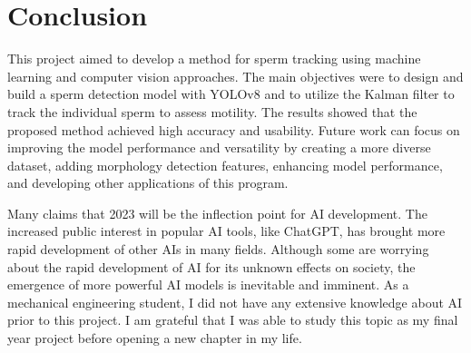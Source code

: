 \chapter{Conclusion}
This project aimed to develop a method for sperm tracking using machine learning and computer vision approaches. The main objectives were to design and build a sperm detection model with YOLOv8 and to utilize the Kalman filter to track the individual sperm to assess motility. The results showed that the proposed method achieved high accuracy and usability. Future work can focus on improving the model performance and versatility by creating a more diverse dataset, adding morphology detection features, enhancing model performance, and developing other applications of this program. 

Many claims that 2023 will be the inflection point for AI development. The increased public interest in popular AI tools, like ChatGPT, has brought more rapid development of other AIs in many fields. Although some are worrying about the rapid development of AI for its unknown effects on society, the emergence of more powerful AI models is inevitable and imminent. As a mechanical engineering student, I did not have any extensive knowledge about AI prior to this project. I am grateful that I was able to study this topic as my final year project before opening a new chapter in my life.